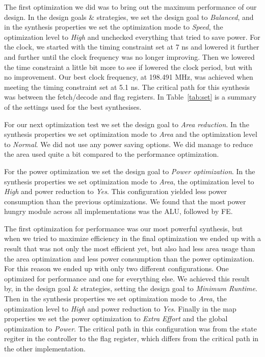 \documentclass[a4,11pt]{article}
\begin{document}
The first optimization we did was to bring out the maximum performance of our design.
In the design goals \& strategies, we set the design goal to {\it Balanced}, and in the 
synthesis properties we set the optimization mode to {\it Speed}, the optimization level to
{\it High} and unchecked everything that tried to save power. For the clock, we started with
the timing constraint set at 7 ns and lowered it further and further until the clock
frequency was no longer improving. Then we lowered the time constraint a little bit
more to see if lowered the clock period, but with no improvement. Our best clock
frequency, at 198.491 MHz, was achieved when meeting the timing constraint set at
5.1 ns. The critical path for this synthesis was between the fetch/decode and flag
registers. In Table~\ref{tab:set} is a summary of the settings used for the best
synthesises.

For our next optimization test we set the design goal to {\it Area reduction}. In the
synthesis properties we set optimization mode to {\it Area} and the optimization level to
{\it Normal}. We did not use any power saving options. We did manage to reduce the area
used quite a bit compared to the performance optimization. 

For the power optimization we set the design goal to {\it Power optimization}. In the 
synthesis properties we set optimization mode to {\it Area}, the optimization level to
{\it High} and power reduction to {\it Yes}. This configuration yielded less power
consumption than the previous optimizations. We found that the most power hungry module
across all implementations was the ALU, followed by FE.

The first optimization for performance was our most powerful synthesis, but when we
tried to maximize efficiency in the final optimization we ended up with a result that
was not only the most efficient yet, but also had less area usage than the area
optimization and less power consumption than the power optimization. For this reason
we ended up with only two different configurations. One optimized for performance and
one for everything else. We achieved this result by, in the design goal \& strategies,
setting the design goal to {\it Minimum Runtime}. Then in the synthesis properties we
set optimization mode to {\it Area}, the optimization level to {\it High} and power
reduction to {\it Yes}. Finally in the map properties we set the power optimization to
{\it Extra Effort} and the global optimization to {\it Power}. The critical path in
this configuration was from the state regiter in the controller to the flag register,
which differs from the critical path in the other implementation.
\end{document}
